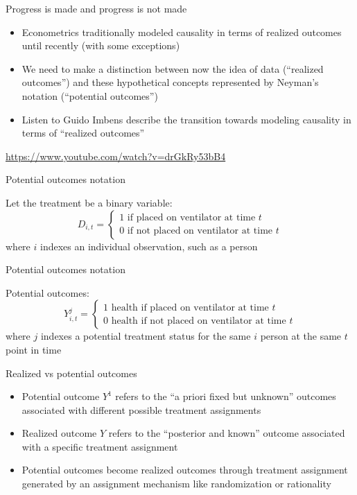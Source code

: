 \documentclass{beamer}
\begin{document}
\begin{frame}{Progress is made and progress is not made}

\begin{itemize}

\item Econometrics traditionally modeled causality in terms of realized outcomes until recently (with some exceptions)
\item We need to make a distinction between now the idea of data (``realized outcomes'') and these hypothetical concepts represented by Neyman's notation (``potential outcomes'')
\item Listen to Guido Imbens describe the transition towards modeling causality in terms of ``realized outcomes''

\end{itemize}

\bigskip

\url{https://www.youtube.com/watch?v=drGkRy53bB4}

\end{frame}



\begin{frame}{Potential outcomes notation}

Let the treatment be a binary variable: $$D_{i,t} =\begin{cases} 1 \text{ if placed on ventilator at time $t$} \\ 0 \text{ if not placed on ventilator at time $t$} \end{cases}$$where $i$ indexes an individual observation, such as a person
\end{frame}

\begin{frame}{Potential outcomes notation}

Potential outcomes: $$Y_{i,t}^j =\begin{cases} 1 \text{ health if placed on ventilator at time $t$} \\ 0 \text{ health if not placed on ventilator at time $t$} \end{cases}$$where $j$ indexes a potential treatment status for the same $i$ person at the same $t$ point in time
\end{frame}


\begin{frame}{Realized vs potential outcomes}

  \begin{itemize}
    \item Potential outcome $Y^1$ refers to the ``a priori fixed but unknown'' outcomes associated with different possible treatment assignments
    \item Realized outcome $Y$ refers to the ``posterior and known'' outcome associated with a specific treatment assignment
    \item Potential outcomes become realized outcomes through treatment assignment generated by an assignment mechanism like randomization or rationality
  \end{itemize}
\end{frame}
\end{document}
